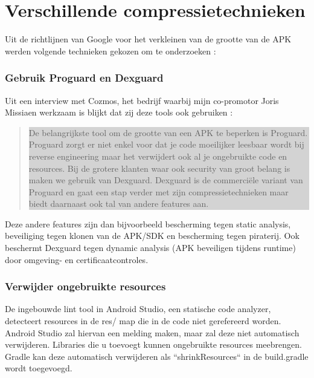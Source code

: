 \section{Verschillende compressietechnieken}
\label{sec:compressietechnieken}

Uit de richtlijnen van Google voor het verkleinen van de grootte van de APK werden volgende technieken gekozen om te onderzoeken \autocite{googlereduceapksize}: 

\subsubsection{Gebruik Proguard en Dexguard}
Uit een interview met Cozmos, het bedrijf waarbij mijn co-promotor Joris Missiaen werkzaam is blijkt dat zij deze tools ook gebruiken : 
\begin{quote}
	\colorbox{lightgray}{\parbox{350px}{De belangrijkste tool om de grootte van een APK te beperken is Proguard. Proguard zorgt er niet enkel voor dat je code moeilijker leesbaar wordt bij reverse engineering maar het verwijdert ook al je ongebruikte code en resources.
	Bij de grotere klanten waar ook security van groot belang is maken we gebruik van Dexguard. Dexguard is de commerciële variant van Proguard en gaat een stap verder met zijn compressietechnieken maar biedt daarnaast ook tal van andere features aan.
	}}
\end{quote}
Deze andere features zijn dan bijvoorbeeld bescherming tegen static analysis, beveiliging tegen klonen van de APK/SDK en bescherming tegen piraterij. Ook beschermt Dexguard tegen dynamic analysis (APK beveiligen tijdens runtime) door omgeving- en certificaatcontroles. 

\subsubsection{Verwijder ongebruikte resources}
\label{sec:removeunusedresources}
De ingebouwde lint tool in Android Studio, een statische code analyzer, detecteert resources in de res/ map die in de code niet gerefereerd worden. Android Studio zal hiervan een melding maken, maar zal deze niet automatisch verwijderen. Libraries die u toevoegt kunnen ongebruikte resources meebrengen. Gradle kan deze automatisch verwijderen als ``shrinkResources`` in de build.gradle wordt toegevoegd. 

